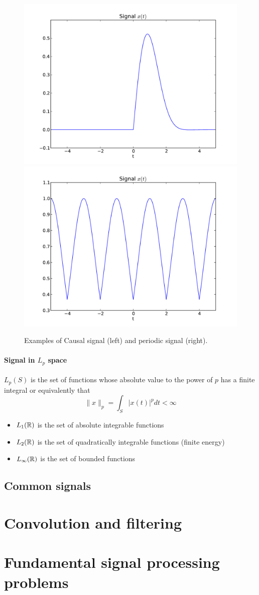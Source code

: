 \begin{figure}[t]
    \centering
    \includegraphics[width=.45\linewidth]{imgs/sig_conv/sig_causal.pdf}
    \includegraphics[width=.45\linewidth]{imgs/sig_conv/sig_per.pdf}
    \caption{Examples of Causal signal (left) and periodic signal (right).}
    \label{fig:ex_causal_per}
\end{figure}



\paragraph{Signal in $L_p$ space}
$L_p(S)$ is the set of functions whose absolute value to the power of $p$
has a finite integral or equivalently that
\begin{equation}
  \|x\|_p=\int_S |x(t)|^p dt < \infty
  \label{eq:lp_space}
\end{equation}
\begin{itemize}
  \item $L_1(\mathbb{R})$ is the set of absolute integrable functions
  \item $L_2(\mathbb{R})$ is the set of quadratically integrable functions (finite energy)
  \item $L_\infty(\mathbb{R})$ is the set of bounded functions
\end{itemize}

\subsection{Common signals}
\label{sec:common_sig}

\section{Convolution and filtering}
\label{sec:conv_filtering}


\section{Fundamental signal processing problems}
\label{sec:sp_prob}